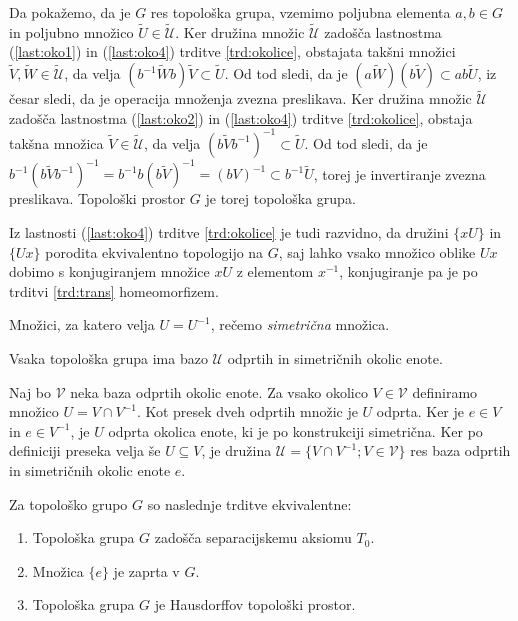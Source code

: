 \documentclass[mat1]{fmfdelo}
\newcommand{\Ucurl}{\mathcal{U}}
\begin{document}
\begin{dokaz}
Da pokažemo, da je $G$ res topološka grupa, vzemimo poljubna elementa $a,b \in G$ in poljubno množico $\widetilde{U} \in \widetilde{\Ucurl}$. Ker družina množic $\widetilde{\Ucurl}$ zadošča lastnostma (\ref{last:oko1}) in (\ref{last:oko4}) trditve \ref{trd:okolice}, obstajata takšni množici $\widetilde{V}, \widetilde{W} \in \widetilde{\Ucurl}$, da velja $(b^{-1}\widetilde{W}b)\widetilde{V} \subset \widetilde{U}$. Od tod sledi, da je $(a\widetilde{W})(b\widetilde{V}) \subset ab\widetilde{U}$, iz česar sledi, da je operacija množenja zvezna preslikava.
Ker družina množic $\widetilde{\Ucurl}$ zadošča lastnostma (\ref{last:oko2}) in (\ref{last:oko4}) trditve \ref{trd:okolice}, obstaja takšna množica $\widetilde{V} \in \widetilde{\Ucurl}$, da velja $(b\widetilde{V}b^{-1})^{-1} \subset \widetilde{U}$. Od tod sledi, da je $b^{-1}(b\widetilde{V}b^{-1})^{-1} = b^{-1}b (b\widetilde{V})^{-1} = (bV)^{-1} \subset b^{-1}\widetilde{U}$, torej je invertiranje zvezna preslikava. Topološki prostor $G$ je torej topološka grupa.

Iz lastnosti (\ref{last:oko4}) trditve \ref{trd:okolice} je tudi razvidno, da družini $\lbrace xU \rbrace$ in $\lbrace Ux \rbrace$ porodita ekvivalentno topologijo na $G$, saj lahko vsako množico oblike $Ux$ dobimo s konjugiranjem množice $xU$ z elementom $x^{-1}$, konjugiranje pa je po trditvi \ref{trd:trans} homeomorfizem.
\end{dokaz}

\begin{definicija}\label{def:sim}
Množici, za katero velja $U = U^{-1}$, rečemo \emph{simetrična} množica.
\end{definicija}

\begin{trditev}\label{trd:sim}
Vsaka topološka grupa ima bazo $\Ucurl$ odprtih in simetričnih okolic enote.
\end{trditev}

\begin{dokaz}
Naj bo $\mathcal{V}$ neka baza odprtih okolic enote. Za vsako okolico $V \in \mathcal{V}$ definiramo množico $U = V \cap V^{-1}$. Kot presek dveh odprtih množic je $U$ odprta. Ker je $e \in V$ in $e \in V^{-1}$, je $U$ odprta okolica enote, ki je po konstrukciji simetrična. Ker po definiciji preseka velja še $U \subseteq V$, je družina $\Ucurl = \lbrace V \cap V^{-1}; V \in \mathcal{V} \rbrace$ res baza odprtih in simetričnih okolic enote $e$.
\end{dokaz}

\begin{trditev}\label{trd:t0haus}
Za topološko grupo $G$ so naslednje trditve ekvivalentne:
\begin{enumerate}
	\item Topološka grupa $G$ zadošča separacijskemu aksiomu $T_0$.\label{podtrd:h1}
	\item Množica $\lbrace e \rbrace$ je zaprta v $G$.\label{podtrd:h2}
	\item Topološka grupa $G$ je Hausdorffov topološki prostor.\label{podtrd:h3}
\end{enumerate}
\end{trditev}
\end{document}
